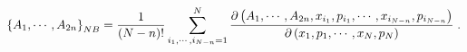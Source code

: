 \begin{equation}
\left\{  A_{1},\cdots,A_{2n}\right\}  _{{\footnotesize NB}}=\frac{1}{\left(
N-n\right)  !}\sum_{i_{1},\cdots,i_{N-n}=1}^{N}\frac{\partial\left(
A_{1},\cdots,A_{2n},x_{i_{1}},p_{i_{1}},\cdots,x_{i_{N-n}},p_{i_{N-n}}\right)
}{\partial\left(  x_{1},p_{1},\cdots,x_{N},p_{N}\right)  }\;.
\label{SymplecticTrace}%
\end{equation}

